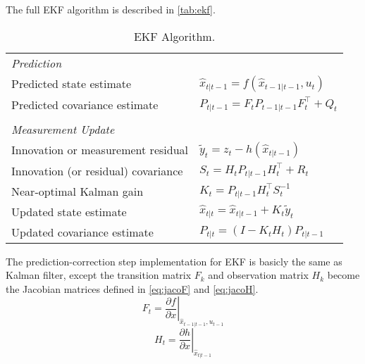 The full \gls{EKF} algorithm is described in \autoref{tab:ekf}.
\begin{table}[h]
\begin{adjustbox}{max width=\textwidth}
  \centering
  \begin{tabular}{ll}
 \textit{Prediction} & \\
Predicted state estimate & $\hat{x}_{t|t-1} = f(\hat{x}_{t-1|t-1}, u_{t})$ \\
Predicted covariance estimate & $P_{t|t-1} =  {{F_{t}}} P_{t-1|t-1}{ {F_{t}^\top}} + Q_{t}$ \\
&\\
\textit{Measurement Update} & \\
Innovation or measurement residual & $\tilde{y}_{t} = z_{t} - h(\hat{x}_{t|t-1})$ \\
Innovation (or residual) covariance & $S_{t} = {{H_{t}}}P_{t|t-1}{{H_{t}^\top}} + R_{t}$ \\
Near-optimal Kalman gain & $K_{t} = P_{t|t-1}{{H_{t}^\top}}S_{t}^{-1}$ \\
Updated state estimate & $\hat{x}_{t|t} = \hat{x}_{t|t-1} + K_{t}\tilde{y}_{t}$ \\
Updated covariance estimate & $P_{t|t} = (I - K_{t} {{H_{t}}}) P_{t|t-1}$ \\
   
  \end{tabular}
  \end{adjustbox}
  \caption{\gls{EKF} Algorithm.}
  \label{tab:ekf}
\end{table}

The prediction-correction step implementation for \gls{EKF} is basicly the same as Kalman filter, except the transition matrix $F_{k}$ and observation matrix $H_{k}$ become the Jacobian matrices defined in \autoref{eq:jacoF} and \autoref{eq:jacoH}. \\
\begin{equation}
\label{eq:jacoF}
{{F_{t}}} = \left . \frac{\partial f}{\partial x } \right \vert _{\hat{x}_{t-1|t-1},u_{t-1}}
\end{equation}
\begin{equation}
\label{eq:jacoH}
{{H_{t}}} = \left . \frac{\partial h}{\partial x } \right \vert _{\hat{x}_{t|t-1}}
\end{equation}


